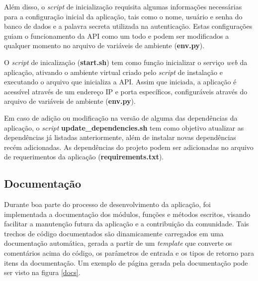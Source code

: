 \documentclass[12pt, openright, oneside, a4paper, brazil]{abntex2}
\begin{document}
Além disso, o \textit{script} de inicialização requisita algumas informações necessárias para a configuração inicial da aplicação, tais como o nome, usuário e senha do banco de dados e a palavra secreta utilizada na autenticação. Estas configurações guiam o funcionamento da API como um todo e podem ser modificados a qualquer momento no arquivo de variáveis de ambiente (\textbf{env.py}).

O \textit{script} de inicalização (\textbf{start.sh}) tem como função inicializar o serviço \textit{web} da aplicação, ativando o ambiente virtual criado pelo \textit{script} de instalação e executando o arquivo que inicializa a API. Assim que iniciada, a aplicação é acessível através de um endereço IP e porta específicos, configuráveis através do arquivo de variáveis de ambiente (\textbf{env.py}).

Em caso de adição ou modificação na versão de alguma das dependências da aplicação, o \textit{script} \textbf{update\_dependencies.sh} tem como objetivo atualizar as dependências já listadas anteriormente, além de instalar novas dependências recém adicionadas. As dependências do projeto podem ser adicionadas no arquivo de requerimentos da aplicação (\textbf{requirements.txt}).

\subsection{Documentação}

Durante boa parte do processo de desenvolvimento da aplicação, foi implementada a documentação dos módulos, funções e métodos escritos, visando facilitar a manutenção futura da aplicação e a contribuição da comunidade. Tais trechos de código documentados são dinamicamente carregados em uma documentação automática, gerada a partir de um \textit{template} que converte os comentários acima do código, os parâmetros de entrada e os tipos de retorno para itens da documentação. Um exemplo de página gerada pela documentação pode ser visto na figura \ref{docs}.
\end{document}
